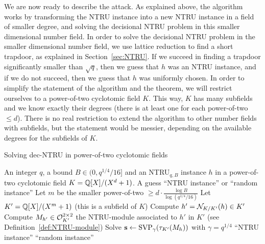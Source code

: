 
We are now ready to describe the attack. As explained above, the algorithm works by transforming the NTRU instance into a new NTRU instance in a field of smaller degree, and solving the decisional NTRU problem in this smaller dimensional number field. In order to solve the decisional NTRU problem in the smaller dimensional number field, we use lattice reduction to find a short trapdoor, as explained in Section~\ref{sec:NTRU}. If we succeed in finding a trapdoor significantly smaller than $\sqrt{q}$, then we guess that $h$ was an NTRU instance, and if we do not succeed, then we guess that $h$ was uniformly chosen.
In order to simplify the statement of the algorithm and the theorem, we will restrict ourselves to a power-of-two cyclotomic field $K$. This way, $K$ has many subfields and we know exactly their degrees (there is at least one for each power-of-two $\leq d$). There is no real restriction to extend the algorithm to other number fields with subfields, but the statement would be messier, depending on the available degrees for the subfields of $K$.

\begin{algorithm}
\caption{Solving dec-NTRU in power-of-two cyclotomic fields}
\label{algo:attack-NTRU}
\begin{algorithmic}[1]
\REQUIRE An integer $q$, a bound $B \in (0,q^{1/4}/16]$ and an NTRU$_{q,B}$ instance $h$ in a power-of-two cyclotomic field $K = \mathbb{Q}[X]/(X^d+1)$.
\ENSURE A guess ``NTRU instance'' or ``random instance'' \vspace{1mm}
\STATE Let $m$ be the smaller power-of-two $\geq d \cdot \frac{\log B}{\log(q^{1/4}/16)}$ \vspace{1mm}
\STATE Let $K' = \mathbb{Q}[X]/(X^m+1)$ (this is a subfield of $K$)\vspace{1mm}
\STATE Compute $h' = \mathcal{N}_{K/K'}(h) \in K'$\vspace{1mm}
\STATE Compute $M_{h'} \in \mathcal{O}_{K'}^{2 \times 2}$ the NTRU-module associated to $h'$ in $K'$ (see Definition~\ref{def:NTRU-module})\vspace{1mm}
\STATE Solve $\mathbf s \leftarrow \text{SVP}_\gamma(\tau_{K'}(M_h))$ with $\gamma = q^{1/4}$\vspace{1mm} \label{step:SVP-NTRU}
\label{step:if-small-NTRU}
	\RETURN ``NTRU instance''
\ELSE
	\RETURN ``random instance''
\ENDIF
\end{algorithmic}
\end{algorithm} 


